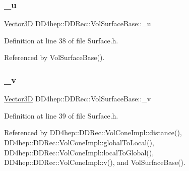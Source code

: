 \hypertarget{class_d_d4hep_1_1_d_d_rec_1_1_vol_surface_base_a15a2648f8b9ead47a28826e4ad0cc6c7}{}\label{class_d_d4hep_1_1_d_d_rec_1_1_vol_surface_base_a15a2648f8b9ead47a28826e4ad0cc6c7} 
\subsubsection{\texorpdfstring{\+\_\+u}{\_u}}
{\footnotesize\ttfamily \hyperlink{class_d_d_surfaces_1_1_vector3_d}{Vector3D} D\+D4hep\+::\+D\+D\+Rec\+::\+Vol\+Surface\+Base\+::\+\_\+u\hspace{0.3cm}{\ttfamily [protected]}}



Definition at line 38 of file Surface.\+h.



Referenced by Vol\+Surface\+Base().

\hypertarget{class_d_d4hep_1_1_d_d_rec_1_1_vol_surface_base_afc7d4d47e7fa6c7a8c87a52e15177bdb}{}\label{class_d_d4hep_1_1_d_d_rec_1_1_vol_surface_base_afc7d4d47e7fa6c7a8c87a52e15177bdb} 
\subsubsection{\texorpdfstring{\+\_\+v}{\_v}}
{\footnotesize\ttfamily \hyperlink{class_d_d_surfaces_1_1_vector3_d}{Vector3D} D\+D4hep\+::\+D\+D\+Rec\+::\+Vol\+Surface\+Base\+::\+\_\+v\hspace{0.3cm}{\ttfamily [protected]}}



Definition at line 39 of file Surface.\+h.



Referenced by D\+D4hep\+::\+D\+D\+Rec\+::\+Vol\+Cone\+Impl\+::distance(), D\+D4hep\+::\+D\+D\+Rec\+::\+Vol\+Cone\+Impl\+::global\+To\+Local(), D\+D4hep\+::\+D\+D\+Rec\+::\+Vol\+Cone\+Impl\+::local\+To\+Global(), D\+D4hep\+::\+D\+D\+Rec\+::\+Vol\+Cone\+Impl\+::v(), and Vol\+Surface\+Base().

\hypertarget{class_d_d4hep_1_1_d_d_rec_1_1_vol_surface_base_afbd867fb78d3da533b12850d152005c2}{}\label{class_d_d4hep_1_1_d_d_rec_1_1_vol_surface_base_afbd867fb78d3da533b12850d152005c2} 
